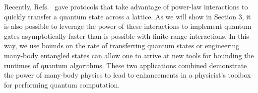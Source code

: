 Recently, Refs.~\cite{Eldredge2017,Guo2020,Tran2020,kuwaharaStrictlyLinearLight2020} gave protocols that take advantage of power-law interactions to quickly transfer a quantum state across a lattice.
As we will show in Section 3, it is also possible to leverage the power of these interactions to implement quantum gates asymptotically faster than is possible with finite-range interactions.
In this way, we use bounds on the rate of transferring quantum states or engineering many-body entangled states can allow one to arrive at new tools for bounding the runtimes of quantum algorithms.
These two applications combined demonstrate the power of many-body physics to lead to enhancements in a physicist's toolbox for performing quantum computation.
